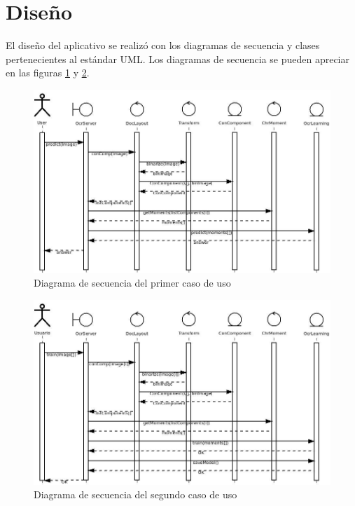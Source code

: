 \documentclass[a4paper, 11pt, oneside]{report}
\begin{document}
\section{Diseño}

El diseño del aplicativo se realizó con los diagramas de secuencia y clases pertenecientes al estándar UML. Los diagramas de secuencia se pueden apreciar en las figuras \ref{fig:sequence1} y \ref{fig:sequence2}.

\begin{figure}
\begin{center}
\includegraphics[width=20cm]{diagrams/sequence1.jpeg}
\end{center}
\caption{Diagrama de secuencia del primer caso de uso}
\label{fig:sequence1}
\end{figure}

\begin{figure}
\begin{center}
\includegraphics[width=20cm]{diagrams/sequence2.jpeg}
\end{center}
\caption{Diagrama de secuencia del segundo caso de uso}
\label{fig:sequence2}
\end{figure}
\end{document}
